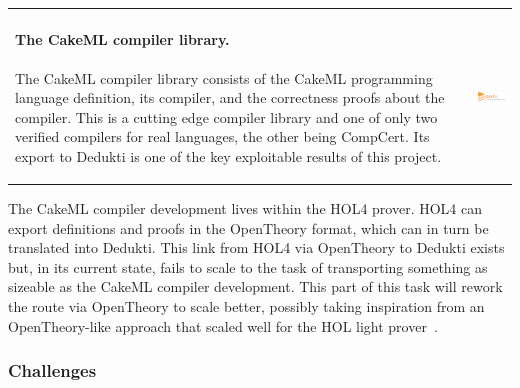 \bigskip
\hspace{-0.9cm}
\begin{tabular}{ll}
\begin{minipage}{13cm}
\paragraph*{The CakeML compiler library.}
The CakeML compiler library consists of the CakeML programming language
definition, its compiler, and the correctness proofs about the
compiler. This is a cutting edge compiler library and one of only two
verified compilers for real languages, the other being CompCert. Its
export to Dedukti is one of the key exploitable results of this project.
 \end{minipage}
&\begin{minipage}{4cm}
  \includegraphics[width=4cm]{logos/CakeML}
\end{minipage}
\end{tabular}

\medskip

The CakeML compiler development lives within the HOL4 prover. HOL4 can
export definitions and proofs in the OpenTheory format, which can in
turn be translated into Dedukti. This link from HOL4 via OpenTheory to
Dedukti exists but, in its current state, fails to scale to the task
of transporting something as sizeable as the CakeML compiler
development. This part of this task will rework the route via
OpenTheory to scale better, possibly taking inspiration from an
OpenTheory-like approach that scaled well for the HOL light
prover~\cite{KaliszykK13}.


\subsubsection*{Challenges}

